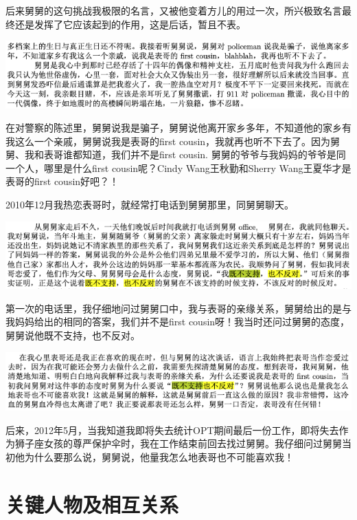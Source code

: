 \documentclass[9pt, b5paper]{article}
\begin{document}
后来舅舅的这句挑战我极限的名言，又被他变着方儿的用过一次，所兴极致名言最终还是发挥了它应该起到的作用，这是后话，暂且不表。 

\begin{center}
\includegraphics[width=.9\linewidth]{./pic/p1p68-2.png}
\end{center}

在对警察的陈述里，舅舅说我是骗子，舅舅说他离开家乡多年，不知道他的家乡有我这么一个亲戚，舅舅说我是表哥的first cousin，我就再也听不下去了。因为舅舅、我和表哥谁都知道，我们并不是first cousin. 舅舅的爷爷与我妈妈的爷爷是同一个人，哪里是什么first cousin呢？Cindy Wang王秋勤和Sherry Wang王夏华才是表哥的first cousin好吧？！

2010年12月我热恋表哥时，就经常打电话到舅舅那里，同舅舅聊天。

\begin{center}
\includegraphics[width=.9\linewidth]{./pic/p1p45-2.png}
\end{center}

第一次的电话里，我仔细地问过舅舅口中，我与表哥的亲缘关系，舅舅给出的是与我妈妈给出的相同的答案，我们并不是first cousin呀！我当时还问过舅舅的态度，舅舅说他既不支持，也不反对。

\begin{center}
\includegraphics[width=.9\linewidth]{./pic/p1p120.png}
\end{center}

后来，2012年5月，当我知道我即将失去统计OPT期间最后一份工作，即将失去作为狮子座女孩的尊严保护伞时，我在工作结束前回去找过舅舅。我仔细问过舅舅当初他为什么要那么说，舅舅说，他量我怎么地表哥也不可能喜欢我！


\section{关键人物及相互关系}
\label{sec:org3e69a89}
\end{document}
